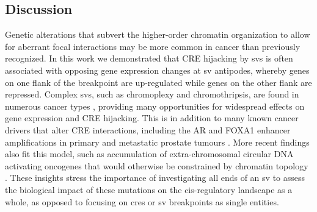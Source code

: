 \subsection{Discussion}

Genetic alterations that subvert the higher-order chromatin organization to allow for aberrant focal interactions may be more common in cancer than previously recognized.
In this work we demonstrated that CRE hijacking by \glspl{sv} is often associated with opposing gene expression changes at \gls{sv} antipodes, whereby genes on one flank of the breakpoint are up-regulated while genes on the other flank are repressed.
Complex \glspl{sv}, such as chromoplexy and chromothripsis, are found in numerous cancer types \cite{bacaPunctuatedEvolutionProstate2013,liPatternsSomaticStructural2020}, providing many opportunities for widespread effects on gene expression and CRE hijacking.
This is in addition to many known cancer drivers that alter CRE interactions, including the AR and FOXA1 enhancer amplifications in primary and metastatic prostate tumours \cite{paroliaDistinctStructuralClasses2019,quigleyGenomicHallmarksStructural2018,takedaSomaticallyAcquiredEnhancer2018,zhouNoncodingMutationsTarget2020,kronTMPRSS2ERGFusion2017,viswanathanStructuralAlterationsDriving2018}.
More recent findings also fit this model, such as accumulation of extra-chromosomal circular DNA activating oncogenes that would otherwise be constrained by chromatin topology \cite{wuCircularEcDNAPromotes2019,kumarATACseqIdentifiesThousands2020,mortonFunctionalEnhancersShape2019,shoshaniChromothripsisDrivesEvolution2021}.
These insights stress the importance of investigating all ends of an \gls{sv} to assess the biological impact of these mutations on the cis-regulatory landscape as a whole, as opposed to focusing on \glspl{cre} or \gls{sv} breakpoints as single entities.

